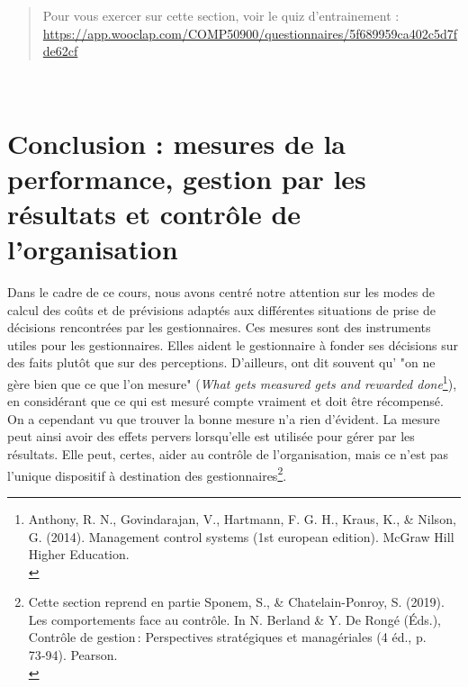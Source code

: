 \documentclass{tufte-handout}
\begin{document}
\begin{quote}
Pour vous exercer sur cette section, voir le quiz d'entrainement : \url{https://app.wooclap.com/COMP50900/questionnaires/5f689959ca402c5d7fde62cf}\\
\end{quote}

\clearpage\\
\section{Conclusion : mesures de la performance, gestion par les résultats et contrôle de l'organisation}
\label{sec:orge24a555}
Dans le cadre de ce cours, nous avons centré notre attention sur les modes de calcul des coûts et de prévisions adaptés aux différentes situations de prise de décisions rencontrées par les gestionnaires. Ces mesures sont des instruments utiles pour les gestionnaires. Elles aident le gestionnaire à fonder ses décisions sur des faits plutôt que sur des perceptions. D'ailleurs, ont dit souvent qu' "on ne gère bien que ce que l'on mesure" (\emph{What gets measured gets and rewarded done}\footnote{Anthony, R. N., Govindarajan, V., Hartmann, F. G. H., Kraus, K., \& Nilson, G. (2014). Management control systems (1st european edition). McGraw Hill Higher Education.\\}), en considérant que ce qui est mesuré compte vraiment et doit être récompensé.\\

On a cependant vu que trouver la bonne mesure n'a rien d’évident. La mesure peut ainsi avoir des effets pervers lorsqu'elle est utilisée pour gérer par les résultats. Elle peut, certes, aider au contrôle de l'organisation, mais ce n'est pas l'unique dispositif à destination des gestionnaires\footnote{Cette section reprend en partie Sponem, S., \& Chatelain-Ponroy, S. (2019). Les comportements face au contrôle. In N. Berland \& Y. De Rongé (Éds.), Contrôle de gestion : Perspectives stratégiques et managériales (4 éd., p. 73‑94). Pearson.\\}.\\
\end{document}
